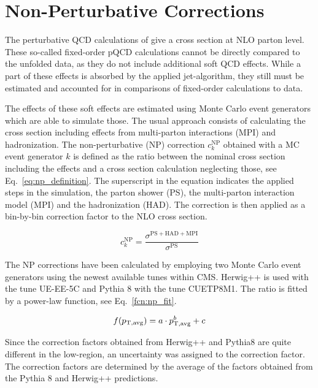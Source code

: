 
\section{Non-Perturbative Corrections}
\label{sec:np_factors}

The perturbative QCD calculations of \NLOJETPP give a cross section at NLO
parton level. These so-called fixed-order pQCD calculations cannot be directly
compared to the unfolded data, as they do not include additional soft QCD
effects. While a part of these effects is absorbed by the applied jet-algorithm,
they still must be estimated and accounted for in comparisons of fixed-order
calculations to data.

The effects of these soft effects are estimated using Monte Carlo event
generators which are able to simulate those. The usual approach consists of
calculating the cross section including effects from multi-parton interactions
(MPI) and hadronization. The non-perturbative (NP) correction $c_k^\mathrm{NP}$
obtained with a MC event generator $k$ is defined as the ratio between the
nominal cross section including the effects and a cross section calculation
neglecting those, see Eq.~\ref{eq:np_definition}. The superscript in the
equation indicates the applied steps in the simulation, the parton shower (PS),
the multi-parton interaction model (MPI) and the hadronization (HAD). The
correction is then applied as a bin-by-bin correction factor to the NLO cross
section.

\begin{equation}
    c_{k}^{\mathrm{NP}} = \frac{\sigma^{\mathrm{PS+HAD+MPI}}}{\sigma^{\mathrm{PS}}}
    \label{eq:np_definition}
\end{equation}

The NP corrections have been calculated by employing two Monte Carlo
event generators using the newest available tunes within CMS. Herwig++ is used
with the tune UE-EE-5C and Pythia 8 with the tune CUETP8M1. The ratio is fitted
by a power-law function, see Eq.~\ref{fcn:np_fit}.

\begin{equation}
  f(p_{\mathrm{T,avg}}) = a \cdot p_{\mathrm{T,avg}}^b + c
  \label{fcn:np_fit}
\end{equation}

Since the correction factors obtained from Herwig++ and Pythia8 are quite
different in the low-\pt region, an uncertainty was assigned to the correction
factor. The correction factors are determined by the average of the factors
obtained from the Pythia 8 and Herwig++ predictions.

